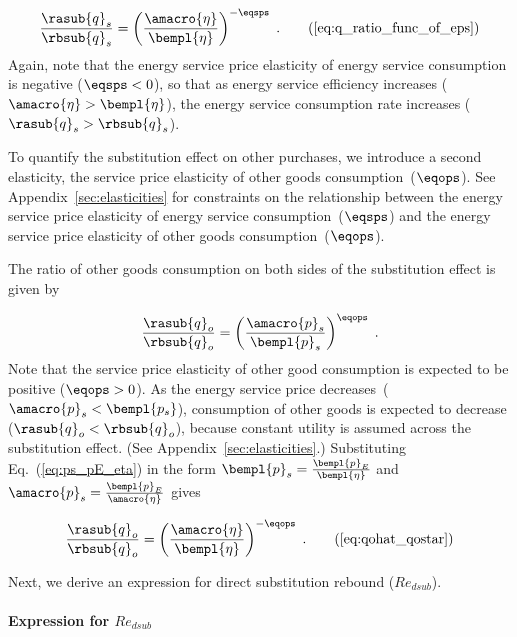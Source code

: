 \begin{equation}
  \frac{\rasub{q}_s}{\rbsub{q}_s} = \left( \frac{\amacro{\eta}}{\bempl{\eta}} \right)^{-\eqsps} \; .
                                                                        \tag{\ref{eq:q_ratio_func_of_eps}}
\end{equation}
%
Again, note that the energy service price elasticity of energy service consumption
is negative ($\eqsps < 0$), so that
as energy service efficiency increases ($\amacro{\eta} > \bempl{\eta}$),
the energy service consumption rate increases ($\rasub{q}_s > \rbsub{q}_s$).

To quantify the substitution effect on other purchases,
we introduce a second elasticity, 
the service price elasticity of other goods consumption~($\eqops$).
See Appendix~\ref{sec:elasticities} for constraints on the relationship between the
energy service price elasticity of energy service consumption~($\eqsps$) and the
energy service price elasticity of other goods consumption~($\eqops$).

The ratio of other goods consumption on both sides of the substitution effect is given by

\begin{equation}
  \frac{\rasub{q}_o}{\rbsub{q}_o} = \left( \frac{\amacro{p}_s}{\bempl{p}_s} \right) ^ {\eqops} \; . 
\end{equation}
%
Note that the service price elasticity of other good consumption
is expected to be positive ($\eqops > 0$).
As the energy service price decreases~($\amacro{p}_s < \bempl{p_s}$), 
consumption of other goods is expected to decrease ($\rasub{q}_o < \rbsub{q}_o$), 
because constant utility is assumed across the substitution effect.
(See Appendix~\ref{sec:elasticities}.)
Substituting Eq.~(\ref{eq:ps_pE_eta}) in the form
$\bempl{p}_s = \frac{\bempl{p}_E}{\bempl{\eta}}$ and
$\amacro{p}_s = \frac{\bempl{p}_E}{\amacro{\eta}}$
gives

\begin{equation}
  \frac{\rasub{q}_o}{\rbsub{q}_o} = \left( \frac{\amacro{\eta}}{\bempl{\eta}} \right) ^ {-\eqops} \; . 
                                                                                              \tag{\ref{eq:qohat_qostar}}
\end{equation}

Next, we derive an expression for direct substitution rebound ($Re_{dsub}$).


\paragraph{Expression for $Re_{dsub}$}
\label{sec:Re_dsub}

